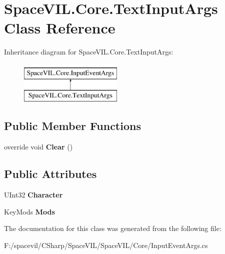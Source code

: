 \hypertarget{class_space_v_i_l_1_1_core_1_1_text_input_args}{}\section{Space\+V\+I\+L.\+Core.\+Text\+Input\+Args Class Reference}
\label{class_space_v_i_l_1_1_core_1_1_text_input_args}
Inheritance diagram for Space\+V\+I\+L.\+Core.\+Text\+Input\+Args\+:\begin{figure}[H]
\begin{center}
\leavevmode
\includegraphics[height=2.000000cm]{class_space_v_i_l_1_1_core_1_1_text_input_args}
\end{center}
\end{figure}
\subsection*{Public Member Functions}
\begin{DoxyCompactItemize}
\item 
\mbox{\label{class_space_v_i_l_1_1_core_1_1_text_input_args_a6f6a339d6cdc2220b27e45cbc6696b07}} 
override void {\bfseries Clear} ()
\end{DoxyCompactItemize}
\subsection*{Public Attributes}
\begin{DoxyCompactItemize}
\item 
\mbox{\label{class_space_v_i_l_1_1_core_1_1_text_input_args_a748163b19d478446685e5ab54eef6e5e}} 
U\+Int32 {\bfseries Character}
\item 
\mbox{\label{class_space_v_i_l_1_1_core_1_1_text_input_args_acb44af185bdc617bdc3a71cd5fb5fc43}} 
Key\+Mods {\bfseries Mods}
\end{DoxyCompactItemize}


The documentation for this class was generated from the following file\+:\begin{DoxyCompactItemize}
\item 
F\+:/spacevil/\+C\+Sharp/\+Space\+V\+I\+L/\+Space\+V\+I\+L/\+Core/Input\+Event\+Args.\+cs\end{DoxyCompactItemize}

